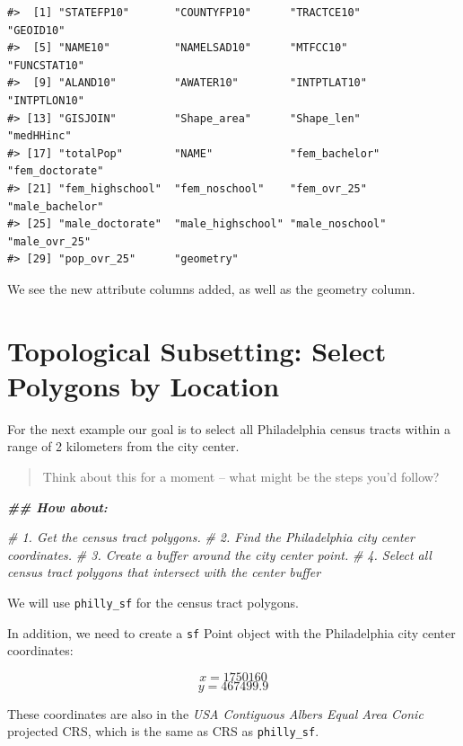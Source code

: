 \documentclass[
]{book}
\newenvironment{Shaded}{\begin{snugshade}}{\end{snugshade}}
\newcommand{\CommentTok}[1]{\textcolor[rgb]{0.56,0.35,0.01}{\textit{#1}}}
\newcommand{\DocumentationTok}[1]{\textcolor[rgb]{0.56,0.35,0.01}{\textbf{\textit{#1}}}}
\begin{document}
\begin{verbatim}
#>  [1] "STATEFP10"       "COUNTYFP10"      "TRACTCE10"       "GEOID10"        
#>  [5] "NAME10"          "NAMELSAD10"      "MTFCC10"         "FUNCSTAT10"     
#>  [9] "ALAND10"         "AWATER10"        "INTPTLAT10"      "INTPTLON10"     
#> [13] "GISJOIN"         "Shape_area"      "Shape_len"       "medHHinc"       
#> [17] "totalPop"        "NAME"            "fem_bachelor"    "fem_doctorate"  
#> [21] "fem_highschool"  "fem_noschool"    "fem_ovr_25"      "male_bachelor"  
#> [25] "male_doctorate"  "male_highschool" "male_noschool"   "male_ovr_25"    
#> [29] "pop_ovr_25"      "geometry"
\end{verbatim}

We see the new attribute columns added, as well as the geometry column.

\hypertarget{topological-subsetting-select-polygons-by-location}{%
\section{Topological Subsetting: Select Polygons by Location}\label{topological-subsetting-select-polygons-by-location}}

For the next example our goal is to select all Philadelphia census tracts within a range of 2 kilometers from the city center.

\begin{quote}
Think about this for a moment -- what might be the steps you'd follow?
\end{quote}

\begin{Shaded}
\begin{Highlighting}[]
\DocumentationTok{\#\# How about:}

\CommentTok{\# 1. Get the census tract polygons.}
\CommentTok{\# 2. Find the Philadelphia city center coordinates.}
\CommentTok{\# 3. Create a buffer around the city center point.}
\CommentTok{\# 4. Select all census tract polygons that intersect with the center buffer}
\end{Highlighting}
\end{Shaded}

We will use \texttt{philly\_sf} for the census tract polygons.

In addition, we need to create a \texttt{sf} Point object with the Philadelphia city center coordinates:

\[x = 1750160\]
\[y = 467499.9\]

These coordinates are also in the \emph{USA Contiguous Albers Equal Area Conic} projected CRS, which is the same as CRS as \texttt{philly\_sf}.
\end{document}
